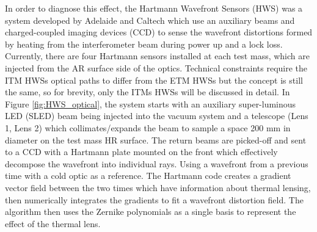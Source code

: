 	In order to diagnose this effect, the Hartmann Wavefront Sensors (HWS) \cite{Brooks_OffAxis} \cite{Veitch_HWS_ALIGO} was a system developed by Adelaide and Caltech \cite{Brooks_HWS_2007} \cite{Brooks_HWS_2009} which use an auxiliary beams and charged-coupled imaging devices (CCD) to sense the wavefront distortions formed by heating from the interferometer beam during power up and a lock loss.  Currently, there are four Hartmann sensors installed at each test mass, which are injected from the AR surface side of the optics. Technical constraints require the ITM HWSs optical paths to differ from the ETM HWSs but the concept is still the same, so for brevity, only the ITMs HWSs will be discussed in detail.  In Figure \ref{fig:HWS_optical}, the system starts with an auxiliary super-luminous LED (SLED) beam being injected into the vacuum system and a telescope (Lens 1, Lens 2) which collimates/expands the beam to sample a space 200 mm in diameter on the test mass HR surface.  The return beams are picked-off and sent to a CCD with a Hartmann plate mounted on the front which effectively decompose the wavefront into individual rays.  Using a wavefront from a previous time with a cold optic as a reference. The Hartmann code creates a gradient vector field between the two times which have information about thermal lensing, then numerically integrates the gradients to fit a wavefront distortion field.  The algorithm then uses the Zernike polynomials as a single basis to represent the effect of the thermal lens. \cite{Brooks_thesis}
	
